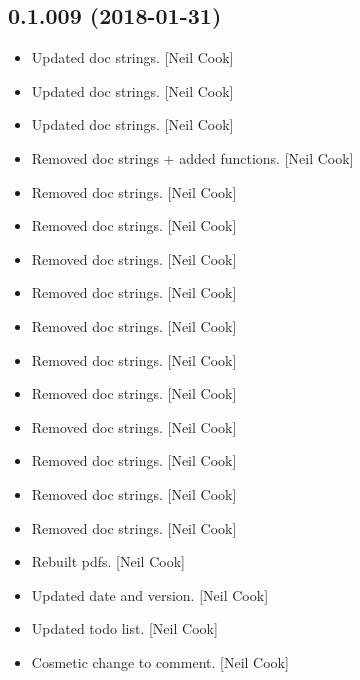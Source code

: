 \documentclass[a4paper,10pt,english]{report}
\begin{document}
\subsection{0.1.009 (2018-01-31)}
\label{\detokenize{misc/changelog:id495}}\begin{itemize}
\item {} 
Updated doc strings. {[}Neil Cook{]}

\item {} 
Updated doc strings. {[}Neil Cook{]}

\item {} 
Updated doc strings. {[}Neil Cook{]}

\item {} 
Removed doc strings + added  functions. {[}Neil Cook{]}

\item {} 
Removed doc strings. {[}Neil Cook{]}

\item {} 
Removed doc strings. {[}Neil Cook{]}

\item {} 
Removed doc strings. {[}Neil Cook{]}

\item {} 
Removed doc strings. {[}Neil Cook{]}

\item {} 
Removed doc strings. {[}Neil Cook{]}

\item {} 
Removed doc strings. {[}Neil Cook{]}

\item {} 
Removed doc strings. {[}Neil Cook{]}

\item {} 
Removed doc strings. {[}Neil Cook{]}

\item {} 
Removed doc strings. {[}Neil Cook{]}

\item {} 
Removed doc strings. {[}Neil Cook{]}

\item {} 
Removed doc strings. {[}Neil Cook{]}

\item {} 
Rebuilt pdfs. {[}Neil Cook{]}

\item {} 
Updated date and version. {[}Neil Cook{]}

\item {} 
Updated todo list. {[}Neil Cook{]}

\item {} 
Cosmetic change to comment. {[}Neil Cook{]}

\end{itemize}
\end{document}
